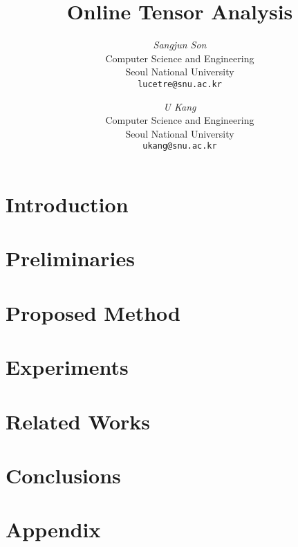 \documentclass[10pt]{article}
\begin{document}
\newcommand\norm[1]{\left\lVert#1\right\rVert}
\newcommand{\beq}{\begin{equation}}
\newcommand{\eeq}{\end{equation}}
\newcommand{\bit}{\begin{itemize*}}
\newcommand{\eit}{\end{itemize*}}
\newcommand{\goal}[1]{ {\noindent {$\Rightarrow$} \em {#1} } }
\newcommand{\hide}[1]{}
\newcommand{\comment}[1]{ {\footnotesize {#1} } }
\newtheorem{lemma}{Lemma}
\newtheorem{theorem}{Theorem}
\newtheorem{proof}{Proof}
\newtheorem{defn}{Definition}
\newtheorem{algo}{Algorithm}
\newtheorem{observation}{Observation}

\title{Online Tensor Analysis}

\author{ {\em Sangjun Son} \\
	    Computer Science and Engineering \\
	    Seoul National University\\
	    {\tt lucetre@snu.ac.kr}
	 \and
	 {\em U Kang} \\
	    Computer Science and Engineering \\
	    Seoul National University\\
	     {\tt ukang@snu.ac.kr}
        }


\maketitle
\begin{abstract}
    
\end{abstract}

\section{Introduction}
    \label{sec:intro}
    

\section{Preliminaries}
    \label{sec:prelim}
    
    
\newpage
\section{Proposed Method}
    \label{sec:proposed}
  	

\newpage
\section{Experiments}
    \label{sec:experiments}
    
    
\section{Related Works}
    \label{sec:related}
        

\section{Conclusions}
    \label{sec:conclusions}
    





\newpage
\appendix
\section{Appendix}

\end{document}
